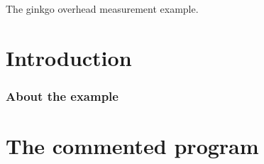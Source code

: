 The ginkgo overhead measurement example.

 \label{_Intro}%
 \label{_Introduction}%
\section*{Introduction}

\label{_Abouttheexample}%
\subsubsection*{About the example }

\label{_CommProg}%
 \section*{The commented program}


